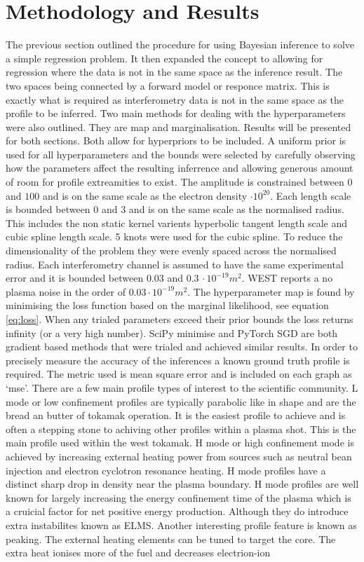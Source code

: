 \chapter{Methodology and Results}

The previous section outlined the procedure for using Bayesian inference to solve a simple regression problem. It then expanded the concept to allowing for regression where the data is not in the same space as the inference result. The two spaces being connected by a forward model or responce matrix. This is exactly what is required as interferometry data is not in the same space as the profile to be inferred. Two main methods for dealing with the hyperparameters were also outlined. They are \gls{map} and marginalisation. Results will be presented for both sections. Both allow for hyperpriors to be included. A uniform prior is used for all hyperparameters and the bounds were selected by carefully observing how the parameters affect the resulting inferrence and allowing generous amount of room for profile extreamities to exist. The amplitude is constrained between $0$ and $100$ and is on the same scale as the electron density $\cdot 10^{20}$. Each length scale is bounded between 0 and 3 and is on the same scale as the normalised radius. This includes the non static kernel varients hyperbolic tangent length scale and cubic spline length scale. 5 knots were used for the cubic spline. To reduce the dimensionality of the problem they were evenly spaced across the normalised radius. Each interferometry channel is assumed to have the same experimental error and it is bounded between $0.03$ and $0.3\, \cdot10^{-19}m^2$. WEST reports a no plasma noise in the order of $0.03 \cdot10^{-19}m^2$. The hyperparameter \gls{map} is found by minimising the loss function based on the marginal likelihood, see equation \ref{eq:loss}. When any trialed parameters exceed their prior bounds the loss returns infinity (or a very high number). SciPy minimise and PyTorch SGD are both gradient based methods that were trialed and achieved similar results. In order to precisely measure the accuracy of the inferences a known ground truth profile is required. The metric used is mean square error and is included on each graph as `mse'. There are a few main profile types of interest to the scientific community. L mode or low confinement profiles are typically parabolic like in shape and are the bread an butter of tokamak operation. It is the easiest profile to achieve and is often a stepping stone to achiving other profiles within a plasma shot. This is the main profile used within the \gls{west} tokamak. H mode or high confinement mode is achieved by increasing external heating power from sources such as neutral bean injection and electron cyclotron resonance heating. H mode profiles have a distinct sharp drop in density near the plasma boundary. H mode profiles are well known for largely increasing the energy confinement time of the plasma which is a cruicial factor for net positive energy production. Although they do introduce extra instabilites known as ELMS. Another interesting profile feature is known as peaking. The external heating elements can be tuned to target the core. The extra heat ionises more of the fuel and decreases electrion-ion 